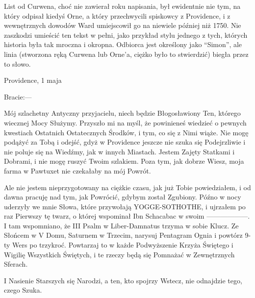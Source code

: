 List od Curwena, choć nie zawierał roku napisania, był ewidentnie nie tym, na który odpisał kiedyś Orne, a który przechwycili spiskowcy z Providence, i z wewnętrznych dowodów Ward umiejscowił go na niewiele później niż 1750. Nie zaszkodzi umieścić ten tekst w pełni, jako przykład stylu jednego z tych, których historia była tak mroczna i okropna. Odbiorca jest określony jako ``Simon'', ale linia (stworzona ręką Curwena lub Orne'a, ciężko było to stwierdzić) biegła przez to słowo.

\begin{displayquote}

\begin{flushright}
Providence, 1 maja
\end{flushright}

Bracie:—

Mój szlachetny Antyczny przyjacielu, niech będzie Błogosławiony Ten, którego wiecznej Mocy Służymy. Przyszło mi na myśl, że powinieneś wiedzieć o pewnych kwestiach Ostatnich Ostatecznych Środków, i tym, co się z Nimi wiąże. Nie mogę podążyć za Tobą i odejść, gdyż w Providence jeszcze nie szuka się Podejrzliwie i nie poluje się na Wiedźmy, jak w innych Miastach. Jestem Zajęty Statkami i Dobrami,  i nie mogę ruszyć Twoim szlakiem. Poza tym, jak dobrze Wiesz, moja farma w Pawtuxet nie czekałaby na mój Powrót.

Ale nie jestem nieprzygotowany na ciężkie czasu, jak już Tobie powiedziałem, i od dawna pracuję nad tym, jak Powrócić, gdybym został Zgubiony. Późno w nocy uderzyły we mnie Słowa, które przywołają YOGGE-SOTHOTHE, i ujrzałem po raz Pierwszy tę twarz, o której wspominał   Ibn Schacabac w swoim ——————. I tam wspomniano, że III Psalm w Liber-Damnatus trzyma w sobie Klucz. Ze Słońcem w V Domu, Saturnem w Trzecim, narysuj Pentagram Ognia i powtórz 9-ty Wers po trzykroć. Powtarzaj to w każde Podwyższenie Krzyża Świętego i Wigilię Wszystkich Świętych, i te rzeczy będą się Pomnażać w Zewnętrznych Sferach.

I Nasienie Starszych się Narodzi, a ten, kto spojrzy Wstecz, nie odnajdzie tego, czego Szuka.


\end{displayquote}
